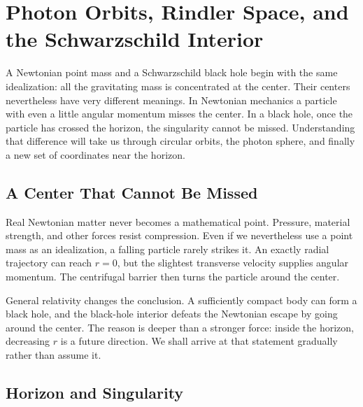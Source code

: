 \chapter{Photon Orbits, Rindler Space, and the Schwarzschild Interior}

A Newtonian point mass and a Schwarzschild black hole begin with the same
idealization: all the gravitating mass is concentrated at the center.  Their
centers nevertheless have very different meanings.  In Newtonian mechanics a
particle with even a little angular momentum misses the center.  In a black
hole, once the particle has crossed the horizon, the singularity cannot be
missed.  Understanding that difference will take us through circular orbits,
the photon sphere, and finally a new set of coordinates near the horizon.

\section{A Center That Cannot Be Missed}

Real Newtonian matter never becomes a mathematical point.  Pressure, material
strength, and other forces resist compression.  Even if we nevertheless use a
point mass as an idealization, a falling particle rarely strikes it.  An
exactly radial trajectory can reach \(r=0\), but the slightest transverse
velocity supplies angular momentum.  The centrifugal barrier then turns the
particle around the center.

General relativity changes the conclusion.  A sufficiently compact body can
form a black hole, and the black-hole interior defeats the Newtonian escape by
going around the center.  The reason is deeper than a stronger force: inside
the horizon, decreasing \(r\) is a future direction.  We shall arrive at that
statement gradually rather than assume it.

\begin{classroomqa}
\end{classroomqa}

\section{Horizon and Singularity}

